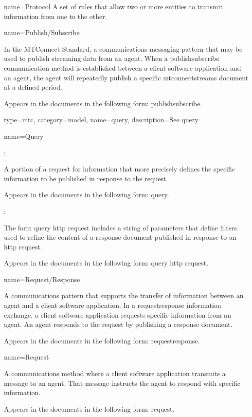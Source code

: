 {
  name={Protocol}
}
{
	A set of rules that allow two or more entities to transmit information from one to the other.
}


{
  name={Publish/Subscribe}
}
{
	In the MTConnect Standard, a communications messaging pattern that may be used to publish \gls{streaming data} from an \gls{agent}.  When a \gls{publishsubscribe} communication method is established between a client software application and an \gls{agent}, the \gls{agent} will repeatedly publish a specific \gls{mtconnectstreams} document at a defined period.

	Appears in the documents in the following form: \gls{publishsubscribe}.
}

{
  type=mtc,
  category=model,
  name={query},
  description={See \gls{query}}
}



{
  name={Query}
}
{
	:

	A portion of a request for information that more precisely defines the specific information to be published in response to the request. 

	Appears in the documents in the following form: \gls{query}.

	:

	The form \gls{query http request} includes a string of parameters that define filters used to refine the content of a \gls{response document} published in response to an \gls{http request}.

	Appears in the documents in the following form: \gls{query http request}.
}


{
  name={Request/Response}
}
{
	A communications pattern that supports the transfer of information between an \gls{agent} and a client software application. In a \gls{requestresponse} information exchange, a client software application requests specific information from an \gls{agent}. An \gls{agent} responds to the \gls{request} by publishing a \gls{response document}.   

	Appears in the documents in the following form: \gls{requestresponse}.
}


{
  name={Request}
}
{
	A communications method where a client software application transmits a message to an \gls{agent}.  That message instructs the \gls{agent} to respond with specific information.

	Appears in the documents in the following form: \gls{request}.
}

